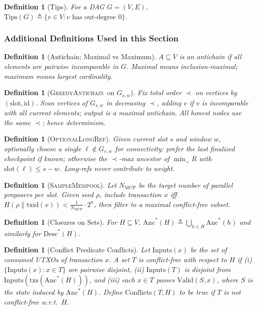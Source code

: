\documentclass[11pt]{article}
\newtheorem{definition}[theorem]{Definition}
\newcommand{\id}{\ensuremath{\mathrm{id}}\xspace}
\newcommand{\slot}{\ensuremath{\mathrm{slot}}\xspace}
\newcommand{\txs}{\ensuremath{\mathrm{txs}}\xspace}
\newcommand{\Anc}{\ensuremath{\mathrm{Anc}}\xspace}
\newcommand{\Desc}{\ensuremath{\mathrm{Desc}}\xspace}
\newcommand{\Valid}{\ensuremath{\mathrm{Valid}}\xspace}
\newcommand{\Conflicts}{\ensuremath{\mathrm{Conflicts}}\xspace}
\newcommand{\Inputs}{\ensuremath{\mathrm{Inputs}}\xspace}
\newcommand{\Tips}{\ensuremath{\mathrm{Tips}}\xspace}
\newcommand{\GreedyAntichain}{\textsc{GreedyAntichain}\xspace}
\newcommand{\SampleMempool}{\textsc{SampleMempool}\xspace}
\newcommand{\OptionalLongRef}{\textsc{OptionalLongRef}\xspace}
\newcommand{\MCP}{\ensuremath{\mathrm{MCP}}\xspace}
\begin{document}
\begin{definition}[Tips]
For a DAG $G=(V,E)$, $\Tips(G)\triangleq\{v\in V:\text{$v$ has out-degree $0$}\}$.
\end{definition}

\subsubsection*{Additional Definitions Used in this Section}

\begin{definition}[Antichain; Maximal vs Maximum]
$A\subseteq V$ is an antichain if all elements are pairwise incomparable in $G$. Maximal means inclusion-maximal; maximum means largest cardinality.
\end{definition}
\begin{definition}[\GreedyAntichain\ on $G_{s,w}$]
Fix total order $\prec$ on vertices by $(\slot,\id)$. Scan vertices of $G_{s,w}$ in decreasing $\prec$, adding $v$ if $v$ is incomparable with all current elements; output is a \emph{maximal} antichain. All honest nodes use the same $\prec$; hence determinism.
\end{definition}
\begin{definition}[\OptionalLongRef]
Given current slot $s$ and window $w$, optionally choose a single $\ell\notin G_{s,w}$ for connectivity: prefer the last finalized checkpoint if known; otherwise the $\prec$-max ancestor of $\min_{\prec}R$ with $\slot(\ell)\le s-w$. Long-refs never contribute to weight.
\end{definition}
\begin{definition}[\SampleMempool]
Let $N_{\MCP}$ be the target number of parallel proposers per slot. Given seed $\rho$, include transaction $x$ iff 
$H(\rho\|\mathrm{txid}(x))<\tfrac{1}{N_{\MCP}}\cdot 2^\kappa$, then filter to a maximal conflict-free subset.
\end{definition}
\begin{definition}[Closures on Sets]
For $H\subseteq V$, $\Anc^*(H)\triangleq \bigcup_{h\in H}\Anc^*(h)$ and similarly for $\Desc^*(H)$.
\end{definition}
\begin{definition}[Conflict Predicate \Conflicts]
Let $\Inputs(x)$ be the set of consumed UTXOs of transaction $x$. A set $T$ is conflict-free with respect to $H$ if (i) $\{\Inputs(x):x\in T\}$ are pairwise disjoint,
(ii) $\Inputs(T)$ is disjoint from $\Inputs(\txs(\Anc^*(H)))$, and (iii) each $x\in T$ passes $\Valid(S,x)$, where $S$ is the state induced by $\Anc^*(H)$. Define $\Conflicts(T,H)$ to be true if $T$ is \emph{not} conflict-free w.r.t.\ $H$.
\end{definition}
\end{document}
